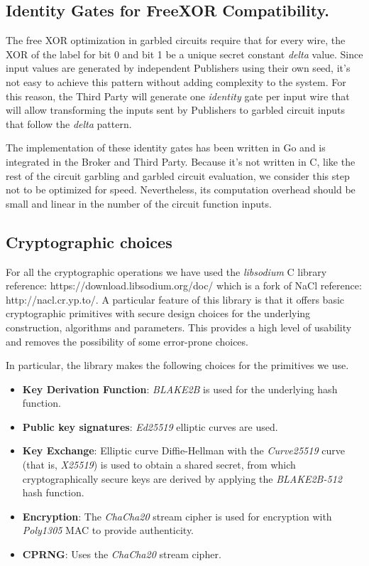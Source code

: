 \subsection{Identity Gates for FreeXOR Compatibility.}

The free XOR optimization in garbled circuits require that for every wire, the
XOR of the label for bit 0 and bit 1 be a unique secret constant \emph{delta}
value.  Since input values are generated by independent Publishers using their
own seed, it's not easy to achieve this pattern without adding complexity to
the system.  For this reason, the Third Party will generate one \emph{identity}
gate per input wire that will allow transforming the inputs sent by Publishers
to garbled circuit inputs that follow the \emph{delta} pattern.

The implementation of these identity gates has been written in Go and is
integrated in the Broker and Third Party.  Because it's not written in C, like
the rest of the circuit garbling and garbled circuit evaluation, we consider
this step not to be optimized for speed.  Nevertheless, its computation
overhead should be small and linear in the number of the circuit function
inputs.


\subsection{Cryptographic choices}

For all the cryptographic operations we have used the \emph{libsodium} C
library {reference: https://download.libsodium.org/doc/} which is a fork of
NaCl {reference: http://nacl.cr.yp.to/}.  A particular feature of this library
is that it offers basic cryptographic primitives with secure design choices
for the underlying construction, algorithms and parameters.  This provides a
high level of usability and removes the possibility of some error-prone
choices.

In particular, the library makes the following choices for the primitives we use.

\begin{itemize}
  \item \textbf{Key Derivation Function}: \emph{BLAKE2B} is used for the
    underlying hash function.
  \item \textbf{Public key signatures}: \emph{Ed25519} elliptic curves are used.
  \item \textbf{Key Exchange}: Elliptic curve Diffie-Hellman with the
    \emph{Curve25519} curve (that is, \emph{X25519}) is used to obtain a shared
    secret, from which cryptographically secure keys are derived by applying
    the \emph{BLAKE2B-512} hash function.
  \item \textbf{Encryption}: The \emph{ChaCha20} stream cipher is used for
    encryption with \emph{Poly1305} MAC to provide authenticity.
  \item \textbf{CPRNG}: Uses the \emph{ChaCha20} stream cipher.
\end{itemize}

